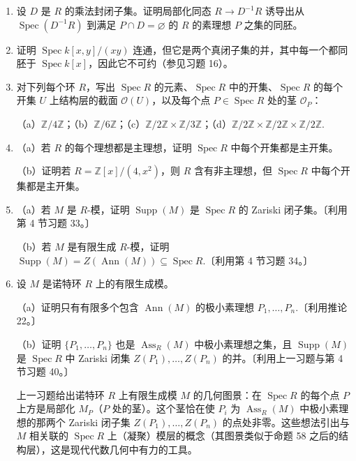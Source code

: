 \begin{enumerate}
\item 设 \(D\) 是 \(R\) 的乘法封闭子集。证明局部化同态 \(R \to D^{-1}R\) 诱导出从 \(\operatorname{Spec}(D^{-1}R)\) 到满足 \(P \cap D = \varnothing\) 的 \(R\) 的素理想 \(P\) 之集的同胚。

\item 证明 \(\operatorname{Spec}k[x,y]/(xy)\) 连通，但它是两个真闭子集的并，其中每一个都同胚于 \(\operatorname{Spec}k[x]\)，因此它不可约（参见习题 16）。

\item 对下列每个环 \(R\)，写出 \(\operatorname{Spec}R\) 的元素、\(\operatorname{Spec}R\) 中的开集、\(\operatorname{Spec}R\) 的每个开集 \(U\) 上结构层的截面 \(\mathcal{O}(U)\)，以及每个点 \(P \in \operatorname{Spec}R\) 处的茎 \(\mathcal{O}_P\)：

（a）\(\mathbb{Z}/4\mathbb{Z}\)；（b）\(\mathbb{Z}/6\mathbb{Z}\)；（c）\(\mathbb{Z}/2\mathbb{Z} \times \mathbb{Z}/3\mathbb{Z}\)；（d）\(\mathbb{Z}/2\mathbb{Z} \times \mathbb{Z}/2\mathbb{Z} \times \mathbb{Z}/2\mathbb{Z}\).

\item （a）若 \(R\) 的每个理想都是主理想，证明 \(\operatorname{Spec}R\) 中每个开集都是主开集。

（b）证明若 \(R = \mathbb{Z}[x]/(4, x^2)\)，则 \(R\) 含有非主理想，但 \(\operatorname{Spec}R\) 中每个开集都是主开集。

\item （a）若 \(M\) 是 \(R\)-模，证明 \(\operatorname{Supp}(M)\) 是 \(\operatorname{Spec}R\) 的 Zariski 闭子集。〔利用第 4 节习题 33。〕

（b）若 \(M\) 是有限生成 \(R\)-模，证明 \(\operatorname{Supp}(M) = Z(\operatorname{Ann}(M)) \subseteq \operatorname{Spec}R\).〔利用第 4 节习题 34。〕

\item 设 \(M\) 是诺特环 \(R\) 上的有限生成模。

（a）证明只有有限多个包含 \(\operatorname{Ann}(M)\) 的极小素理想 \(P_1, \ldots, P_n\).〔利用推论 22。〕

（b）证明 \(\{P_1, \ldots, P_n\}\) 也是 \(\operatorname{Ass}_R(M)\) 中极小素理想之集，且 \(\operatorname{Supp}(M)\) 是 \(\operatorname{Spec}R\) 中 Zariski 闭集 \(Z(P_1), \ldots, Z(P_n)\) 的并。〔利用上一习题与第 4 节习题 40。〕

\noindent 上一习题给出诺特环 \(R\) 上有限生成模 \(M\) 的几何图景：在 \(\operatorname{Spec}R\) 的每个点 \(P\) 上方是局部化 \(M_P\)（\(P\) 处的茎）。这个茎恰在使 \(P_i\) 为 \(\operatorname{Ass}_R(M)\) 中极小素理想的那两个 Zariski 闭子集 \(Z(P_1), \ldots, Z(P_n)\) 的点处非零。这些想法引出与 \(M\) 相关联的 \(\operatorname{Spec}R\) 上（凝聚）模层的概念（其图景类似于命题 58 之后的结构层），这是现代代数几何中有力的工具。


\end{enumerate}
